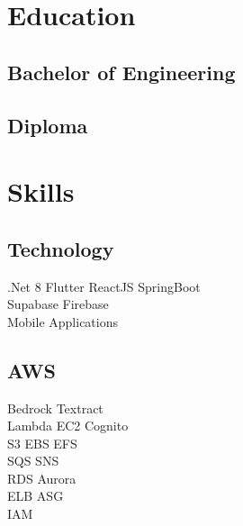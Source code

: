 \documentclass[]{deedy-resume-reversed}
\begin{document}
\begin{minipage}[t]{0.33\textwidth}


\section{Education}

\subsection{Bachelor of Engineering}
\sectionsep

\subsection{Diploma}
\sectionsep


\section{Skills}

\subsection{Technology}
.Net 8  \textbullet Flutter \textbullet ReactJS \textbullet SpringBoot \\
Supabase \textbullet Firebase  \\
Mobile Applications
\sectionsep

\subsection{AWS}
Bedrock \textbullet Textract \\
Lambda \textbullet EC2 \textbullet Cognito \\
S3 \textbullet EBS \textbullet EFS\\
SQS \textbullet SNS \\
RDS \textbullet Aurora \\
ELB \textbullet ASG \\
IAM \\
\sectionsep


\end{minipage}
\end{document}
